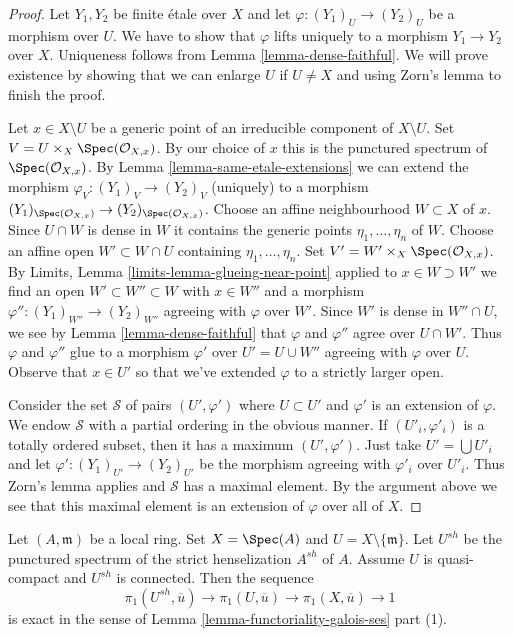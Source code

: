 \begin{proof}
Let $Y_1, Y_2$ be finite \'etale over $X$ and let
$\varphi : (Y_1)_U \to (Y_2)_U$ be a morphism over $U$. We have to show that
$\varphi$ lifts uniquely to a morphism $Y_1 \to Y_2$ over $X$.
Uniqueness follows from Lemma \ref{lemma-dense-faithful}.
We will prove existence by showing that we can enlarge $U$
if $U \not = X$ and using Zorn's lemma to finish the proof.

\medskip\noindent
Let $x \in X \setminus U$ be a generic point of an irreducible component
of $X \setminus U$. Set $V = U \times_X \Spec(\mathcal{O}_{X, x})$.
By our choice of $x$ this is the punctured spectrum of
$\Spec(\mathcal{O}_{X, x})$. By
Lemma \ref{lemma-same-etale-extensions}
we can extend the morphism $\varphi_V : (Y_1)_V \to (Y_2)_V$
(uniquely) to a morphism
$(Y_1)_{\Spec(\mathcal{O}_{X, x})} \to (Y_2)_{\Spec(\mathcal{O}_{X, x})}$.
Choose an affine neighbourhood $W \subset X$ of $x$.
Since $U \cap W$ is dense in $W$ it contains the generic points
$\eta_1, \ldots, \eta_n$ of $W$. Choose an affine open
$W' \subset W \cap U$ containing $\eta_1, \ldots, \eta_n$.
Set $V' = W' \times_X \Spec(\mathcal{O}_{X, x})$.
By Limits, Lemma \ref{limits-lemma-glueing-near-point}
applied to $x \in W \supset W'$
we find an open $W' \subset W'' \subset W$ with $x \in W''$
and a morphism $\varphi'' : (Y_1)_{W''} \to (Y_2)_{W''}$
agreeing with $\varphi$ over $W'$. Since $W'$ is dense in
$W'' \cap U$, we see by Lemma \ref{lemma-dense-faithful}
that $\varphi$ and $\varphi''$ agree over $U \cap W'$.
Thus $\varphi$ and $\varphi''$ glue to a morphism
$\varphi'$ over $U' = U \cup W''$ agreeing with $\varphi$ over $U$.
Observe that $x \in U'$ so that we've extended $\varphi$
to a strictly larger open.

\medskip\noindent
Consider the set $\mathcal{S}$ of pairs $(U', \varphi')$ where $U \subset U'$
and $\varphi'$ is an extension of $\varphi$. We endow $\mathcal{S}$
with a partial ordering in the obvious manner. If $(U'_i, \varphi'_i)$
is a totally ordered subset, then it has a maximum $(U', \varphi')$.
Just take $U' = \bigcup U'_i$ and let
$\varphi' : (Y_1)_{U'} \to (Y_2)_{U'}$ be the morphism
agreeing with $\varphi'_i$ over $U'_i$. Thus Zorn's lemma applies
and $\mathcal{S}$ has a maximal element. By the argument above
we see that this maximal element is an extension of $\varphi$
over all of $X$.
\end{proof}

\begin{lemma}
\label{lemma-local-exact-sequence}
Let $(A, \mathfrak m)$ be a local ring. Set $X = \Spec(A)$ and
$U = X \setminus \{\mathfrak m\}$. Let $U^{sh}$ be the punctured spectrum
of the strict henselization $A^{sh}$ of $A$.
Assume $U$ is quasi-compact and $U^{sh}$ is connected. Then the sequence
$$
\pi_1(U^{sh}, \overline{u}) \to \pi_1(U, \overline{u}) \to
\pi_1(X, \overline{u}) \to 1
$$
is exact in the sense of Lemma \ref{lemma-functoriality-galois-ses} part (1).
\end{lemma}

